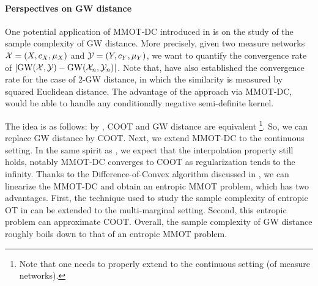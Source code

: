 
\paragraph{Perspectives on GW distance} One potential application of MMOT-DC introduced
in  is on the study of the sample complexity of GW distance.
More precisely, given two measure networks $\mathcal X = (X, c_X, \mu_X)$ and $\mathcal Y = (Y, c_Y, \mu_Y)$,
we want to quantify the convergence rate of $|\text{GW}(\mathcal X, \mathcal Y) - \text{GW}(\mathcal X_n, \mathcal Y_n)|$.
Note that, \cite{Zhang23} have also established the convergence rate for the case of $2$-GW distance,
in which the similarity is measured by squared Euclidean distance.
The advantage of the approach via MMOT-DC, would be able to handle any
conditionally negative semi-definite kernel.

The idea is as follows: by ,
COOT and GW distance are equivalent
\footnote{Note that one needs to properly extend  to the continuous setting
(of measure networks).}. So, we can replace GW distance by COOT.
Next, we extend MMOT-DC to the continuous setting. In the same spirit as ,
we expect that the interpolation property still holds,
notably MMOT-DC converges to COOT as regularization tends to the infinity.
Thanks to the Difference-of-Convex algorithm discussed in ,
we can linearize the MMOT-DC and obtain an entropic MMOT problem, which has two advantages.
First, the technique used to study the sample complexity of entropic OT in \citep{Genevay19}
can be extended to the multi-marginal setting. Second, this entropic problem can approximate COOT.
Overall, the sample complexity of GW distance roughly boils down to that of an entropic MMOT problem.

